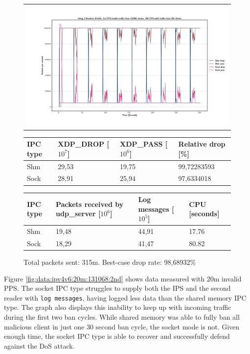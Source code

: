 \begin{figure}[!h]
	\centering
	\scriptsize
	\begin{tabular}{c}
    	\centerline{\includegraphics[width=1.2\textwidth]{images/IPv4v6_1m_2ndReader_1.png}}
	\end{tabular}
	\begin{tabular}{llll}
		\toprule
		\textbf{IPC type} & \textbf{XDP\_DROP [$10^7$]} & \textbf{XDP\_PASS [$10^6$]} & \textbf{Relative drop [\%]} \\ \midrule 
		Shm & 29,53 & 19,75 & 99,72283593 \\
        Sock & 28,91 & 25,94 & 97,6334018 \\
	\bottomrule
	\end{tabular}
    \begin{tabular}{llll}
		\toprule
		\textbf{IPC type} & \textbf{Packets received by udp\_server [$10^6$]} & \textbf{Log messages [$10^5$]} & \textbf{CPU [seconds]} \\ \midrule 
		Shm & 19,48 & 44,91 & 17.76 \\
        Sock & 18,29 & 41,47 & 80.82 \\
	\bottomrule
	\end{tabular}
	\caption[Simplefail2ban with 2nd Reader, IPv4v6, 1m \ac{PPS}, 131068 malicious clients]{Total packets sent: 315m. Best-case drop rate: 98,68932\%}
	\label{fig:data:ipv4v6:1m:131068:2nd}
\end{figure}

Figure \ref{fig:data:ipv4v6:20m:131068:2nd} shows data measured with 20m invalid \ac{PPS}.
The socket \ac{IPC} type struggles to supply both the \ac{IPS} and the second reader with \texttt{log messages}, having logged less data than the shared memory \ac{IPC} type.
The graph also displays this inability to keep up with incoming traffic during the first two ban cycles.
While shared memory was able to fully ban all malicious client in just one 30 second ban cycle, the socket mode is not.
Given enough time, the socket \ac{IPC} type is able to recover and successfully defend against the \ac{DoS} attack.

